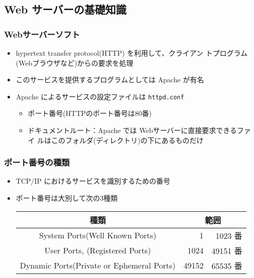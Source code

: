 \subsection{Web サーバーの基礎知識}
\begin{frame}[containsverbatim]
\frametitle{Webサーバーソフト}
\begin{itemize}
 \item hypertext transfer protocol(HTTP) を利用して、クライアン
トプログラム(Webブラウザなど)からの要求を処理
 \item このサービスを提供するプログラムとしては Apache が有名
 \item Apache によるサービスの設定ファイルは
       {\texttt{httpd.conf}}
\begin{itemize}
 \item ポート番号(HTTPのポート番号は80番)
 \item ドキュメントルート：Apache では Webサーバーに直接要求できるファイ
       ルはこのフォルダ(ディレクトリ)の下にあるものだけ
\end{itemize}
\end{itemize}
\end{frame}
\begin{frame}[containsverbatim]
\frametitle{ポート番号の種類}
\begin{itemize}
 \item TCP/IP におけるサービスを識別するための番号
 \item ポート番号は大別して次の3種類
\begin{center}
 \begin{tabular}{|c|r@{番$\sim$}r<{番}|%
}
\hline
種類 &\multicolumn{2}{c|}{範囲}%
 \\\hline
  System Ports(Well Known Ports)& 1&1023 %
\\ \hline
  User Ports, (Registered Ports)& 1024&49151 %
\\  \hline
  Dynamic Ports(Private or Ephemeral Ports)& 49152& 65535%
 \\ \hline
 \end{tabular}
\end{center}
\end{itemize}
\end{frame}
